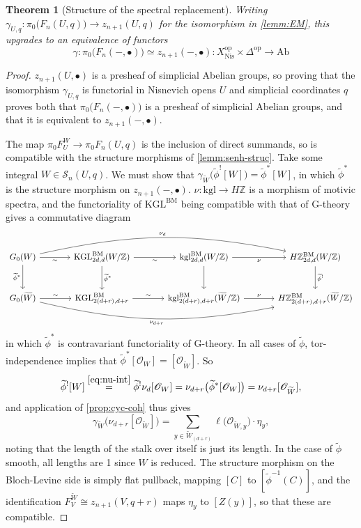 \documentclass[11pt, twoside]{article}
\numberwithin{equation}{section}
\newtheorem{theorem}[equation]{Theorem}
\theoremstyle{definition}
\newcommand{\bb}[1]{\mathbb{#1}}
\newcommand{\Kgl}{\mathrm{KGL}}
\newcommand{\kgl}{\mathrm{kgl}}
\newcommand{\bm}{\mathrm{BM}}
\newcommand{\nis}{\mathrm{Nis}}
\newcommand{\G}{\mathrm{G}}
\newcommand{\op}{\mathrm{op}}
\begin{document}
\begin{theorem}[Structure of the spectral replacement]
Writing \(\gamma_{U, q} \colon \pi_0 \big(F_n(U, q)\big) \to z_{n + 1}(U, q)\) for the isomorphism in \ref{lemm:EM}, this upgrades to an equivalence of functors 
\[\gamma \colon \pi_0\big(F_n( -, \bullet)\big) \simeq z_{n + 1}( -, \bullet) \colon X_\nis^\op \times \Delta^\op \to \mathrm{Ab}\]
\end{theorem}

\begin{proof}
\(z_{n + 1}(U, \bullet)\) is a presheaf of simplicial Abelian groups, so proving that the isomorphism \(\gamma_{U, q}\) is functorial in Nisnevich opens \(U\) and simplicial coordinates \(q\) proves both that \(\pi_0\big(F_n( -, \bullet)\big)\) is a presheaf of simplicial Abelian groups, and that it is equivalent to \(z_{n + 1}( -, \bullet)\).

The map \(\pi_0 F_U^W \to \pi_0 F_n(U, q)\) is the inclusion of direct summands, so is compatible with the structure morphisms of \ref{lemm:senh-struc}. Take some integral \(W \in \mathcal{S}_n(U, q)\). We must show that \(\gamma_{\tilde{W}}\big(\tilde{\phi}^![W]\big) = \tilde{\phi}^*[W]\), in which \(\tilde{\phi}^*\) is the structure morphism on \(z_{n + 1}(- , \bullet)\). \(\nu \colon \kgl \to H\bb{Z}\) is a morphism of motivic spectra, and the functoriality of \(\Kgl^\bm\) being compatible with that of \(\G\)-theory \cite[Corollarly 3.3.7]{Jin} gives a commutative diagram
\[\begin{tikzcd} [row sep = large, column sep = large]
G_0(W) \ar[d, "\tilde{\phi}^*", swap] \ar[r, "\sim", swap] \ar[rrr, "\nu_d", bend left = 12] & \Kgl_{2d, d}^\bm(W/\bb{Z}) \ar[d, "\tilde{\phi}^*"] \ar[r, "\sim", swap] & \kgl_{2d, d}^\bm(W/\bb{Z}) \ar[d] \ar[r, "\nu", swap] & H\bb{Z}_{2d, d}^\bm(W/\bb{Z}) \ar[d, "\tilde{\phi}^!"]\\
G_0(\tilde{W}) \ar[rrr, "\nu_{d + r}", bend right = 12, swap] \ar[r, "\sim"] & \Kgl_{2(d + r), d + r}^\bm \ar[r, "\sim"] & \kgl_{2(d + r), d + r}^\bm(\tilde{W}/\bb{Z}) \ar[r, "\nu"] & H\bb{Z}_{2(d + r), d + r}^\bm(\tilde{W}/\bb{Z})
\end{tikzcd}\]
in which \(\tilde{\phi}^*\) is contravariant functoriality of \(\G\)-theory. In all cases of \(\tilde{\phi}\), tor-independence implies that \(\tilde{\phi}^*[\mathscr{O}_W] = [\mathscr{O}_{\tilde{W}}]\). So 
\[\tilde{\phi}^![W] \stackrel{\eqref{eq:nu-int}} = \tilde{\phi}^!\nu_d[\mathscr{O}_W] = \nu_{d + r}\big(\tilde{\phi}^*[\mathscr{O}_W]\big) = \nu_{d + r}[\mathscr{O}_{\tilde{W}}],\]
and application of \ref{prop:cyc-coh} thus gives 
\[\gamma_{\tilde{W}}\big(\nu_{d + r}[\mathscr{O}_{\tilde{W}}]\big) = \sum_{y \in \tilde{W}_{(d + r)}} \ell(\mathscr{O}_{\tilde{W}, y}\big) \cdot \eta_y,\]
noting that the length of the stalk over itself is just its length. In the case of \(\tilde{\phi}\) smooth, all lengths are 1 since \(W\) is reduced. The structure morphism on the Bloch-Levine side is simply flat pullback, mapping \([C]\) to \([\tilde{\phi}^{- 1}(C)]\), and the identification \(F_V^{\tilde{W}} \cong z_{n + 1}(V, q + r)\) maps \(\eta_y\) to \([Z(y)]\), so that these are compatible.


\end{proof}
\end{document}
